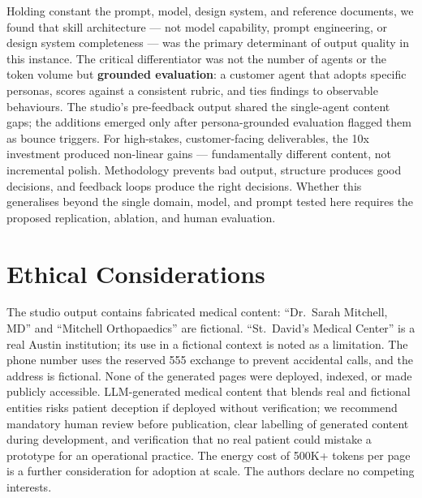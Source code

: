 \documentclass[a4paper]{llncs}
\begin{document}
Holding constant the prompt, model, design system, and reference documents, we
found that skill architecture --- not model capability, prompt engineering, or
design system completeness --- was the primary determinant of output quality in
this instance. The critical differentiator was not the number of agents or the
token volume but \textbf{grounded evaluation}: a customer agent that adopts
specific personas, scores against a consistent rubric, and ties findings to
observable behaviours. The studio's pre-feedback output shared the single-agent
content gaps; the additions emerged only after persona-grounded evaluation
flagged them as bounce triggers. For high-stakes, customer-facing deliverables,
the 10x investment produced non-linear gains --- fundamentally different
content, not incremental polish. Methodology prevents bad output, structure
produces good decisions, and feedback loops produce the right decisions.
Whether this generalises beyond the single domain, model, and prompt tested here
requires the proposed replication, ablation, and human evaluation.

\section{Ethical Considerations}
\label{sec:ethics}

The studio output contains fabricated medical content: ``Dr.~Sarah Mitchell,
MD'' and ``Mitchell Orthopaedics'' are fictional. ``St.~David's Medical
Center'' is a real Austin institution; its use in a fictional context is noted
as a limitation. The phone number uses the reserved 555 exchange to prevent
accidental calls, and the address is fictional. None of the generated pages
were deployed, indexed, or made publicly accessible. LLM-generated medical
content that blends real and fictional entities risks patient deception if
deployed without verification; we recommend mandatory human review before
publication, clear labelling of generated content during development, and
verification that no real patient could mistake a prototype for an operational
practice. The energy cost of 500K+ tokens per page is a further consideration
for adoption at scale. The authors declare no competing interests.

\let\OLDthebibliography\thebibliography
\renewcommand\thebibliography[1]{%
  \OLDthebibliography{#1}%
  \setlength{\itemsep}{1pt}%
  \setlength{\parsep}{0pt}%
}


\end{document}
